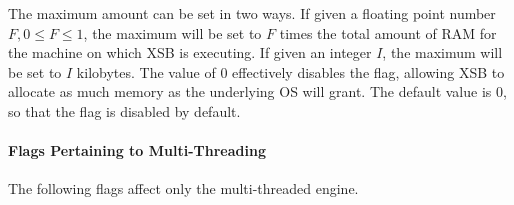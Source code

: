 \begin{description}
\begin{itemize}
  The maximum amount can be set in two ways.  If given a floating
  point number $F, 0 \le F \leq 1$, the maximum will be set to $F$
  times the total amount of RAM for the machine on which XSB is
  executing.  If given an integer $I$, the maximum will be set to $I$
  kilobytes.  The value of 0 effectively disables the flag, allowing
  XSB to allocate as much memory as the underlying OS will grant.  The
  default value is 0, so that the flag is disabled by default.
\end{itemize}

%
%


\paragraph{Flags Pertaining to Multi-Threading}
The following flags affect only the multi-threaded engine.


\end{description}
